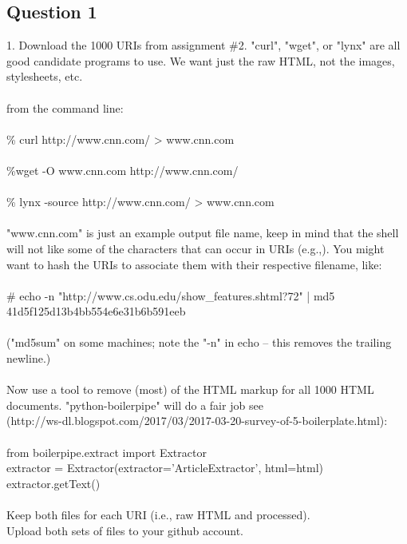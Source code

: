 \documentclass[10pt,letterpaper]{article}
\begin{document}
\subsection{Question 1}
1.  Download the 1000 URIs from assignment \#2.  "curl", "wget", or
"lynx" are all good candidate programs to use.  We want just the
raw HTML, not the images, stylesheets, etc.\\
\\
from the command line:\\
\\
\% curl http://www.cnn.com/ > www.cnn.com\\
\\
\%wget -O www.cnn.com http://www.cnn.com/\\
\\
\% lynx -source http://www.cnn.com/ > www.cnn.com\\
\\
"www.cnn.com" is just an example output file name, keep in mind
that the shell will not like some of the characters that can occur
in URIs (e.g.,).  You might want to hash the URIs to associate 
them with their respective filename, like:\\
\\
\# echo -n "http://www.cs.odu.edu/show\_features.shtml?72" | md5
41d5f125d13b4bb554e6e31b6b591eeb\\
\\
("md5sum" on some machines; note the "-n" in echo -- this removes
the trailing newline.)\\
\\
Now use a tool to remove (most) of the HTML markup for all 1000 HTML documents.
"python-boilerpipe" will do a fair job see\\ 
(http://ws-dl.blogspot.com/2017/03/2017-03-20-survey-of-5-boilerplate.html):\\
\\
	from boilerpipe.extract import Extractor\\
	extractor = Extractor(extractor='ArticleExtractor', html=html)\\
	extractor.getText()\\
\\
Keep both files for each URI (i.e., raw HTML and processed).\\ 
Upload both sets of files to your github account.\\
\\
\pagebreak
\end{document}
